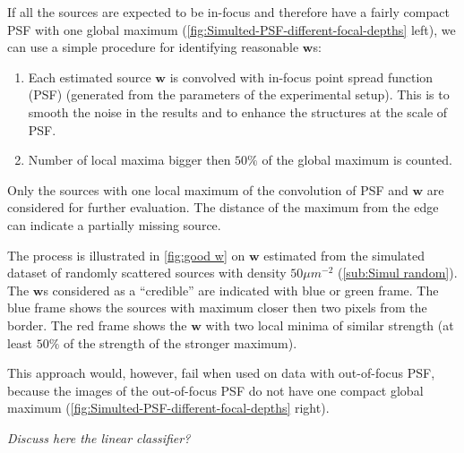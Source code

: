 %
If all the sources are expected to be in-focus and therefore have a fairly compact PSF with one global maximum (\autoref{fig:Simulted-PSF-different-focal-depths} left), we can use a simple procedure for identifying reasonable $\bm{w}$s:
%
\begin{enumerate}
	\item
	Each estimated source $\bm{w}$ is convolved with in-focus point spread function (PSF) (generated from the parameters of the experimental setup). This is to smooth the noise in the results and to enhance the structures at the scale of PSF. 
	\item
	Number of local maxima bigger then $50\%$ of the global maximum is counted. 
\end{enumerate}

Only the sources with one local maximum of the convolution of PSF and $\bm{w}$ are considered for further evaluation. The distance of the maximum from the edge can indicate a partially missing source. 

The process is illustrated in \autoref{fig:good w} on $\bm{w}$ estimated from the simulated dataset of randomly scattered sources with density $50\unit{\mu m^{-2}}$ (\autoref{sub:Simul random}). The $\bm{w}$s considered as a ``credible'' are indicated with blue or green frame. The blue frame shows the sources with maximum closer then two pixels from the border. The red frame shows the $\bm{w}$ with two local minima of similar strength (at least $50\%$ of the strength of the stronger maximum).

This approach would, however, fail when used on data with out-of-focus PSF, because the images of the out-of-focus PSF do not have one compact global maximum (\autoref{fig:Simulted-PSF-different-focal-depths} right).

\emph{Discuss here the linear classifier?} \fix

